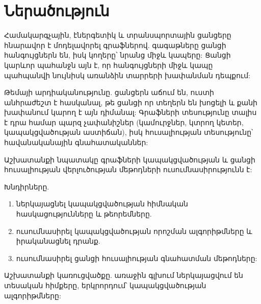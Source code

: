 
\chapter*{Ներածություն}

Համակարգչային, էներգետիկ և տրանսպորտային ցանցերը հնարավոր է մոդելավորել գրաֆներով. գագաթները ցանցի հանգույցներն են, իսկ կողերը՝ նրանց միջև կապերը: Ցանցի կարևոր պահանջն այն է, որ հանգույցների միջև կապը պահպանվի նույնիսկ առանձին տարրերի խափանման դեպքում:

Թեմայի արդիականությունը. ցանցերն աճում են, ուստի անհրաժեշտ է հասկանալ, թե ցանցի որ տեղերն են խոցելի և քանի խափանում կարող է այն դիմանալ: Գրաֆների տեսությունը տալիս է դրա համար պարզ չափանիշներ (կամուրջներ, կտրող կետեր, կապակցվածության աստիճան), իսկ հուսալիության տեսությունը՝ հավանականային գնահատականներ:

Աշխատանքի նպատակը գրաֆների կապակցվածության և ցանցի հուսալիության վերլուծության մեթոդների ուսումնասիրությունն է:

Խնդիրները.
\begin{enumerate}
  \item ներկայացնել կապակցվածության հիմնական հասկացությունները և թեորեմները.
  \item ուսումնասիրել կապակցվածության որոշման ալգորիթմները և իրականացնել դրանք.
  \item ուսումնասիրել ցանցի հուսալիության գնահատման մեթոդները:
\end{enumerate}

Աշխատանքի կառուցվածքը. առաջին գլխում ներկայացվում են տեսական հիմքերը, երկրորդում՝ կապակցվածության ալգորիթմները:
